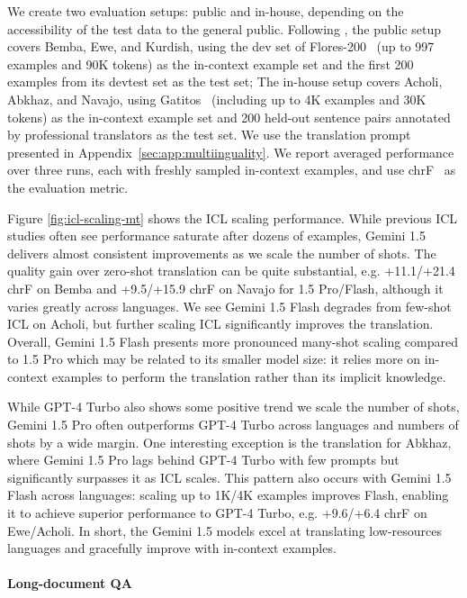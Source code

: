 We create two evaluation setups: public and in-house, depending on the accessibility of the test data to the general public. Following \citet{agarwal2024many}, the public setup covers Bemba, Ewe, and Kurdish, using the dev set of Flores-200~\citep{flores200} (up to 997 examples and 90K tokens) as the in-context example set and the first 200 examples from its devtest set as the test set; The in-house setup covers Acholi, Abkhaz, and Navajo, using Gatitos~\citep{jones2023bilex} (including up to 4K examples and 30K tokens) as the in-context example set and 200 held-out sentence pairs annotated by professional translators as the test set. We use the translation prompt presented in Appendix~\ref{sec:app:multiinguality}. We report averaged performance over three runs, each with freshly sampled in-context examples, and use chrF~\citep{popovic-2015-chrf} as the evaluation metric.

Figure \ref{fig:icl-scaling-mt} shows the ICL scaling performance. While previous ICL studies often see performance saturate after dozens of examples, Gemini 1.5 delivers almost consistent improvements as we scale the number of shots. The quality gain over zero-shot translation can be quite substantial, e.g. +11.1/+21.4 chrF on Bemba and +9.5/+15.9 chrF on Navajo for 1.5 Pro/Flash, although it varies greatly across languages. We see Gemini 1.5 Flash degrades from few-shot ICL on Acholi, but further scaling ICL significantly improves the translation. Overall, Gemini 1.5 Flash presents more pronounced many-shot scaling compared to 1.5 Pro which may be related to its smaller model size: it relies more on in-context examples to perform the translation rather than its implicit knowledge.

While GPT-4 Turbo also shows some positive trend we scale the number of shots, Gemini 1.5 Pro often outperforms GPT-4 Turbo across languages and numbers of shots by a wide margin. One interesting exception is the translation for Abkhaz, where Gemini 1.5 Pro lags behind GPT-4 Turbo with few prompts but significantly surpasses it as ICL scales. This pattern also occurs with Gemini 1.5 Flash across languages: scaling up to 1K/4K examples improves Flash, enabling it to achieve superior performance to GPT-4 Turbo, e.g. +9.6/+6.4 chrF on Ewe/Acholi. In short, the Gemini 1.5 models excel at translating low-resources languages and gracefully improve with in-context examples.

\paragraph{Long-document QA}

